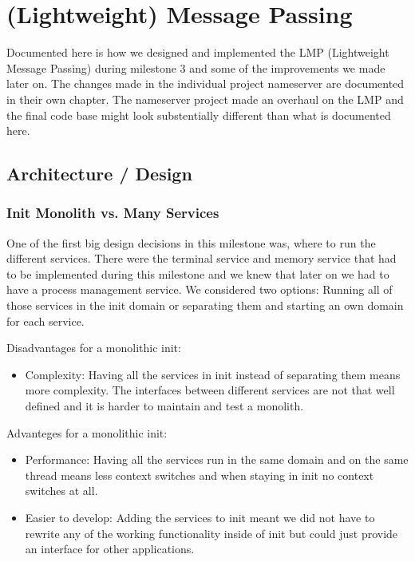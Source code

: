 \chapter{(Lightweight) Message Passing}

Documented here is how we designed and implemented the LMP (Lightweight Message Passing) during milestone 3 and some of the improvements we made later on. The changes made in the individual project nameserver are documented in their own chapter. The nameserver project made an overhaul on the LMP and the final code base might look substentially different than what is documented here.

\section{Architecture / Design}

\subsection{Init Monolith vs. Many Services}

One of the first big design decisions in this milestone was, where to run the different services. There were the terminal service and memory service that had to be implemented during this milestone and we knew that later on we had to have a process management service. We considered two options: Running all of those services in the init domain or separating them and starting an own domain for each service.

Disadvantages for a monolithic init:
\begin{itemize}
    \item Complexity: Having all the services in init instead of separating them means more complexity. The interfaces between different services are not that well defined and it is harder to maintain and test a monolith.
\end{itemize}

Advanteges for a monolithic init:
\begin{itemize}
    \item Performance: Having all the services run in the same domain and on the same thread means less context switches and when staying in init no context switches at all.
    \item Easier to develop: Adding the services to init meant we did not have to rewrite any of the working functionality inside of init but could just provide an interface for other applications.
\end{itemize}

